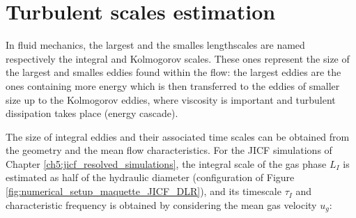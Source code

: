 \chapter{Turbulent scales estimation}
\label{app:turbulent_scales_estimation}



%
%
%	
%
%	
%
%	
%
%	
%

In fluid mechanics, the largest and the smalles lengthscales are named respectively the integral and Kolmogorov scales. These ones represent the size of the largest and smalles eddies found within the flow: the largest eddies are the ones containing more energy which is then transferred to the eddies of smaller size up to the Kolmogorov eddies, where viscosity is important and turbulent dissipation takes place (energy cascade).

The size of integral eddies and their associated time scales can be obtained from the geometry and the mean flow characteristics. For the JICF simulations of Chapter \ref{ch5:jicf_resolved_simulations}, the integral scale of the gas phase $L_I$ is estimated as half of the hydraulic diameter (configuration of Figure \ref{fig:numerical_setup_maquette_JICF_DLR}), and its timescale $\tau_I$ and characteristic frequency is obtained by considering the mean gas velocity $u_g$:

